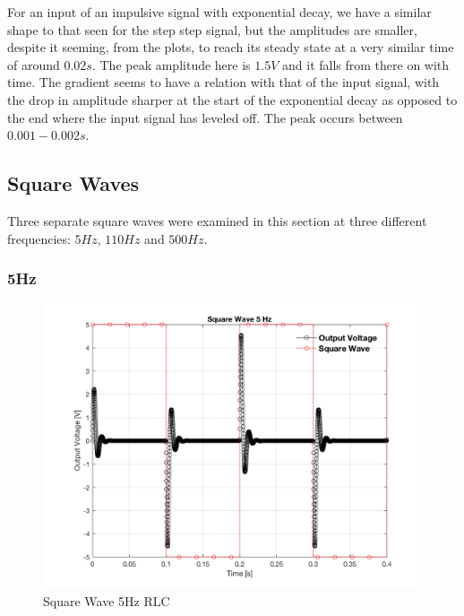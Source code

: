 \documentclass[a4paper, 12pt]{article}
\begin{document}
For an input of an impulsive signal with exponential decay, we have a similar shape to that seen for the step step signal, but the amplitudes are smaller, despite it seeming, from the plots, to reach its steady state at a very similar time of around $0.02s$. The peak amplitude here is $1.5V$ and it falls from there on with time. The gradient seems to have a relation with that of the input signal, with the drop in amplitude sharper at the start of the exponential decay as opposed to the end where the input signal has leveled off. The peak occurs between $0.001-0.002s$.

\newpage
\subsection{Square Waves}

Three separate square waves were examined in this section at three different frequencies: $5Hz$, $110Hz$ and $500Hz$.

\subsubsection{5Hz}

\begin{figure}[h]
\centering
\includegraphics[width=\textwidth]{ex3/Square_Wave_5_Hz.png}
\caption{Square Wave 5Hz RLC}
\label{fig:Square Wave 5Hz RLC}
\end{figure}
\end{document}
